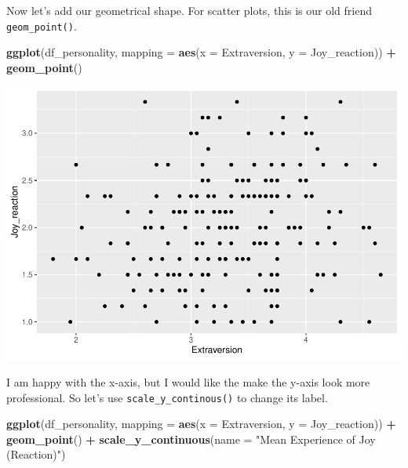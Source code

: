 \documentclass[
]{book}
\newenvironment{Shaded}{\begin{snugshade}}{\end{snugshade}}
\newcommand{\AttributeTok}[1]{\textcolor[rgb]{0.13,0.29,0.53}{#1}}
\newcommand{\FunctionTok}[1]{\textcolor[rgb]{0.13,0.29,0.53}{\textbf{#1}}}
\newcommand{\NormalTok}[1]{#1}
\newcommand{\SpecialCharTok}[1]{\textcolor[rgb]{0.81,0.36,0.00}{\textbf{#1}}}
\newcommand{\StringTok}[1]{\textcolor[rgb]{0.31,0.60,0.02}{#1}}
\begin{document}
Now let's add our geometrical shape. For scatter plots, this is our old friend \texttt{geom\_point()}.

\begin{Shaded}
\begin{Highlighting}[]
\FunctionTok{ggplot}\NormalTok{(df\_personality, }\AttributeTok{mapping =} \FunctionTok{aes}\NormalTok{(}\AttributeTok{x =}\NormalTok{ Extraversion, }\AttributeTok{y =}\NormalTok{ Joy\_reaction)) }\SpecialCharTok{+}
  \FunctionTok{geom\_point}\NormalTok{()}
\end{Highlighting}
\end{Shaded}

\includegraphics{rintro_demo_files/figure-latex/unnamed-chunk-308-1.pdf}

I am happy with the x-axis, but I would like the make the y-axis look more professional. So let's use \texttt{scale\_y\_continous()} to change its label.

\begin{Shaded}
\begin{Highlighting}[]
\FunctionTok{ggplot}\NormalTok{(df\_personality, }\AttributeTok{mapping =} \FunctionTok{aes}\NormalTok{(}\AttributeTok{x =}\NormalTok{ Extraversion, }\AttributeTok{y =}\NormalTok{ Joy\_reaction)) }\SpecialCharTok{+}
  \FunctionTok{geom\_point}\NormalTok{() }\SpecialCharTok{+}
  \FunctionTok{scale\_y\_continuous}\NormalTok{(}\AttributeTok{name =} \StringTok{"Mean Experience of Joy (Reaction)"}\NormalTok{) }
\end{Highlighting}
\end{Shaded}
\end{document}
